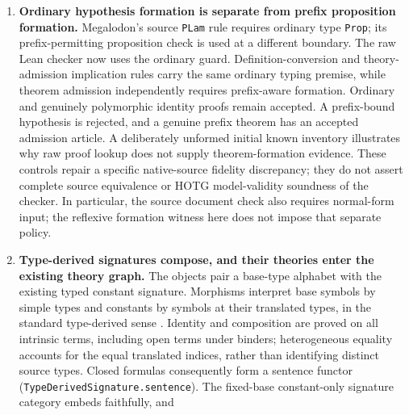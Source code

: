 \documentclass[11pt]{article}
\theoremstyle{definition}
\theoremstyle{remark}
\begin{document}
\begin{enumerate}
  In the existing term-closed Henkin semantic interface, the defined equality
  implies intrinsic extensional equality: lambda closure admits a separating
  predicate constructed with intrinsic equality. Agreement at all types and
  admitted values holds exactly when admitted functions respect that
  extensional equality
  (\nolinkurl{HenkinEqualityInterpretation.functionsRespectEqv_iff_equality_agreement}).
  Full domains are unnecessary. The existing non-full monotone Boolean model
  gives a counterexample without the congruence condition. This is a comparison
  in that semantic interface, not a soundness theorem for all native proof rules
  or a semantics of arbitrary prefix-polymorphic sentences.
\item \textbf{Ordinary hypothesis formation is separate from prefix
  proposition formation.} Megalodon's source \texttt{PLam} rule requires
  ordinary type \texttt{Prop}; its prefix-permitting proposition check is
  used at a different boundary. The raw Lean checker now uses the ordinary
  guard. Definition-conversion and theory-admission implication rules carry
  the same ordinary typing premise, while theorem admission independently
  requires prefix-aware formation. Ordinary and genuinely polymorphic
  identity proofs remain accepted. A prefix-bound hypothesis is rejected,
  and a genuine prefix theorem has an accepted admission article. A
  deliberately unformed initial known inventory illustrates why raw proof
  lookup does not supply theorem-formation evidence. These controls repair
  a specific native-source fidelity discrepancy; they do not assert complete
  source equivalence or HOTG model-validity soundness of the checker. In
  particular, the source document check also requires normal-form input;
  the reflexive formation witness here does not impose that separate policy.
\item \textbf{Type-derived signatures compose, and their theories enter the
  existing theory graph.} The objects pair a base-type alphabet with the
  existing typed constant signature. Morphisms interpret base symbols by
  simple types and constants by symbols at their translated types, in the
  standard type-derived sense \cite{CodescuHenkin}. Identity and composition
  are proved on all intrinsic terms, including open terms under binders;
  heterogeneous equality accounts for the equal translated indices, rather
  than identifying distinct source types. Closed formulas consequently
  form a sentence functor (\nolinkurl{TypeDerivedSignature.sentence}).
  The fixed-base constant-only signature category embeds faithfully, and

\end{enumerate}
\end{document}
